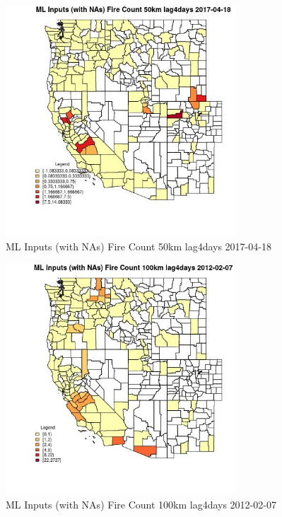\begin{figure} 
\centering  
\includegraphics[width=0.77\textwidth]{Code_Outputs/Report_ML_input_PM25_Step4_part_f_de_duplicated_aves_prioritize_24hr_obswNAs_CountyFire_Count_50km_lag4daysMean2017-04-18.jpg} 
\caption{\label{fig:Report_ML_input_PM25_Step4_part_f_de_duplicated_aves_prioritize_24hr_obswNAsCountyFire_Count_50km_lag4daysMean2017-04-18}ML Inputs (with NAs) Fire Count 50km lag4days 2017-04-18} 
\end{figure} 
 

\begin{figure} 
\centering  
\includegraphics[width=0.77\textwidth]{Code_Outputs/Report_ML_input_PM25_Step4_part_f_de_duplicated_aves_prioritize_24hr_obswNAs_CountyFire_Count_100km_lag4daysMean2012-02-07.jpg} 
\caption{\label{fig:Report_ML_input_PM25_Step4_part_f_de_duplicated_aves_prioritize_24hr_obswNAsCountyFire_Count_100km_lag4daysMean2012-02-07}ML Inputs (with NAs) Fire Count 100km lag4days 2012-02-07} 
\end{figure} 
 


